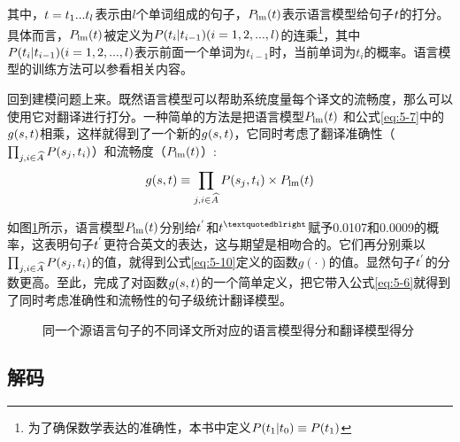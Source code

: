 \noindent  其中，${t}=t_1...t_l$表示由$l$个单词组成的句子，${P}_{\textrm{lm}}({t})$表示语言模型给句子${t}$的打分。具体而言，${P}_{\textrm{lm}}({t})$被定义为${P}(t_i|t_{i-1})(i=1,2,...,l)$的连乘\footnote{为了确保数学表达的准确性，本书中定义${P}(t_1|t_0) \equiv {P}(t_1)$}，其中${P}(t_i|t_{i-1})(i=1,2,...,l)$表示前面一个单词为$t_{i-1}$时，当前单词为$t_i$的概率。语言模型的训练方法可以参看{\chaptertwo}相关内容。

\parinterval 回到建模问题上来。既然语言模型可以帮助系统度量每个译文的流畅度，那么可以使用它对翻译进行打分。一种简单的方法是把语言模型${P}_{\textrm{lm}}{({t})}$ 和公式\eqref{eq:5-7}中的$g({s},{t})$相乘，这样就得到了一个新的$g({s},{t})$，它同时考虑了翻译准确性（$\prod_{j,i \in \widehat{A}}{{P}(s_j,t_i)}$）和流畅度（${P}_{\textrm{lm}}({t})$）:
\begin{eqnarray}
g({s},{t}) \equiv \prod_{j,i \in \widehat{A}}{{P}(s_j,t_i)} \times  {P}_{\textrm{lm}}({t})
\label{eq:5-10}
\end{eqnarray}

\parinterval 如图\ref{fig:5-9}所示，语言模型${P}_{\textrm{lm}}({t})$分别给${t}^{'}$和$\seq{t}^{”}$赋予0.0107和0.0009的概率，这表明句子${t}^{'}$更符合英文的表达，这与期望是相吻合的。它们再分别乘以$\prod_{j,i \in \widehat{A}}{{P}(s_j},t_i)$的值，就得到公式\eqref{eq:5-10}定义的函数$g(\cdot)$的值。显然句子${t}^{'}$的分数更高。至此，完成了对函数$g({s},{t})$的一个简单定义，把它带入公式\eqref{eq:5-6}就得到了同时考虑准确性和流畅性的句子级统计翻译模型。

\begin{figure}[htp]
    \centering

    \caption{同一个源语言句子的不同译文所对应的语言模型得分和翻译模型得分}
    \label{fig:5-9}
\end{figure}



\subsection{解码}
\label{sec:simple-decoding}

